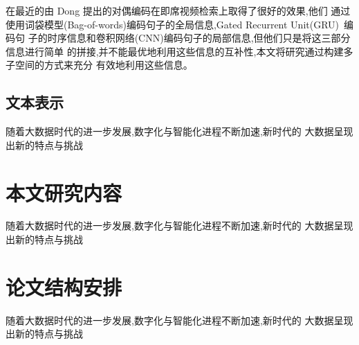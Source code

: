 在最近的由 Dong \etal\cite{}提出的对偶编码在即席视频检索上取得了很好的效果,他们
通过使用词袋模型(Bag-of-words)编码句子的全局信息,Gated Recurrent Unit(GRU)~\cite{}编码句
子的时序信息和卷积网络(CNN)编码句子的局部信息,但他们只是将这三部分信息进行简单
的拼接,并不能最优地利用这些信息的互补性,本文将研究通过构建多子空间的方式来充分
有效地利用这些信息。

\subsection{文本表示}
随着大数据时代的进一步发展,数字化与智能化进程不断加速,新时代的
大数据呈现出新的特点与挑战
\section{本文研究内容}
随着大数据时代的进一步发展,数字化与智能化进程不断加速,新时代的
大数据呈现出新的特点与挑战
\section{论文结构安排}
随着大数据时代的进一步发展,数字化与智能化进程不断加速,新时代的
大数据呈现出新的特点与挑战

